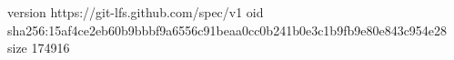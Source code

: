 version https://git-lfs.github.com/spec/v1
oid sha256:15af4ce2eb60b9bbbf9a6556c91beaa0cc0b241b0e3c1b9fb9e80e843c954e28
size 174916
